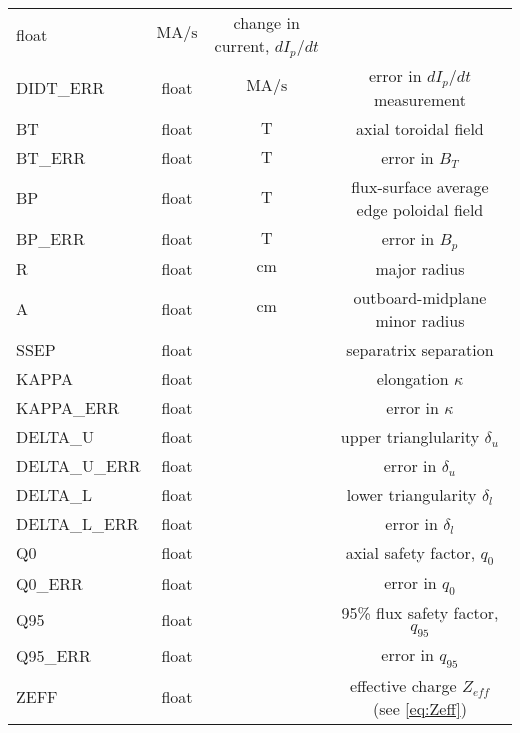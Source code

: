 \begin{table*}[h]
{\begin{tabular}{lccc}
   float &
   $\si{\mega\ampere\per\second}$ &
   change in current, $dI_p/dt$
   \\
   DIDT\_ERR &
   float &
   $\si{\mega\ampere\per\second}$ &
   error in $dI_p/dt$ measurement
   \\
   BT &
   float &
   $\si{\tesla}$ &
   axial toroidal field
   \\
   BT\_ERR &
   float &
   $\si{\tesla}$ &
   error in $B_T$
   \\
   BP &
   float &
   $\si{\tesla}$ &
   flux-surface average edge poloidal field
   \\
   BP\_ERR &
   float &
   $\si{\tesla}$ &
   error in $B_p$
   \\
   R &
   float &
   $\si{\centi\meter}$ &
   major radius
   \\
   A &
   float &
   $\si{\centi\meter}$ &
   outboard-midplane minor radius
   \\
   SSEP &
   float &
   \note{?} &
   separatrix separation\note{?}
   \\
   KAPPA &
   float &
   &
   elongation $\kappa$
   \\
   KAPPA\_ERR &
   float &
   &
   error in $\kappa$
   \\
   DELTA\_U &
   float &
   &
   upper trianglularity $\delta_u$
   \\
   DELTA\_U\_ERR &
   float &
   &
   error in $\delta_u$
   \\
   DELTA\_L &
   float &
   &
   lower triangularity $\delta_l$
   \\
   DELTA\_L\_ERR &
   float &
   &
   error in $\delta_l$
   \\
   Q0 &
   float &
   &
   axial safety factor, $q_0$
   \\
   Q0\_ERR &
   float &
   &
   error in $q_0$
   \\
   Q95 &
   float &
   &
   95\% flux safety factor, $q_{95}$
   \\
   Q95\_ERR &
   float &
   &
   error in $q_{95}$
   \\
   ZEFF &
   float &
   &
   effective charge $Z_{eff}$ (see \cref{eq:Zeff})
   \\
   \bottomrule
  \end{tabular}}
\end{table*}

\nicechapterending